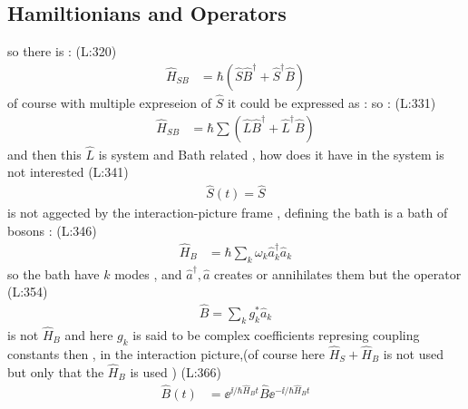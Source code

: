 \subsection{Hamiltionians and Operators}
 so there is :
(L:320)
\begin{equation}
\begin{split}
\label{systemHamSB}\hat{H }_{S B }&=\hbar \left(\hat{S }\hat{B }^\dagger +\hat{S }^\dagger \hat{B }\right)\end{split}
\end{equation}
 of course with multiple expreseion of 
 $ \hat{S } $  it could be expressed as : 
 so : 
(L:331)
\begin{equation}
\begin{split}
\hat{H }_{S B }&=\hbar \sum \left(\hat{L }\hat{B }^\dagger +\hat{L }^\dagger \hat{B }\right)\end{split}
\end{equation}
 and then this 
 $ \hat{L } $  is system and Bath related , 
 how does it have in the system is not interested 
(L:341)
\begin{equation}
\begin{split}
\hat{S }(t )=\hat{S }\end{split}
\end{equation}
 is not aggected by the interaction-picture frame ,
 defining the bath is a bath of  bosons :  
(L:346)
\begin{equation}
\begin{split}
\hat{H }_{B }&=\hbar \sum _{k }\omega _{k }\hat{a }^\dagger _{k }\hat{a }_{k }\end{split}
\end{equation}
 so the bath have
 $ k  $  modes , and 
 $ \hat{a }^\dagger ,\hat{a } $  creates or annihilates them 
 but the operator
(L:354)
\begin{equation}
\begin{split}
\hat{B }=\sum _{k }g _{k }^*\hat{a }_{k }\end{split}
\end{equation}
 is not
 $ \hat{H }_{B } $  and here  
 $ g _{k } $  is said to be complex coefficients represing coupling constants
 then , in the interaction picture,(of course here
 $ \hat{H }_{S }+\hat{H }_{B } $  is not used but only that the 
 $ \hat{H }_{B } $  is used )
(L:366)
\begin{equation}
\begin{split}
\label{timeB}\hat{B }(t )&=\ee ^{\ii /\hbar \hat{H }_{B }t }\hat{B }\ee ^{-\ii /\hbar \hat{H }_{B }t }\end{split}
\end{equation}
